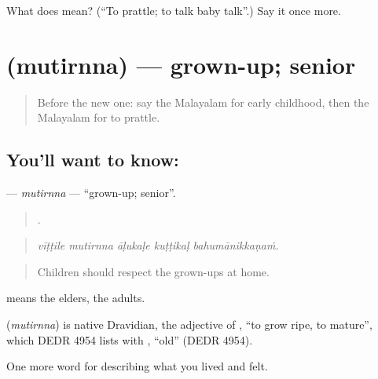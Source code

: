 \begin{tcolorbox}[breakable,colback=teal!4,colframe=teal!35!black,title={Before you move on}]
What does  mean? (\textquotedblleft{}To prattle; to talk baby talk\textquotedblright{}.) Say it once more.
\end{tcolorbox}
\section[\texorpdfstring{\ml{മുതിർന്ന} (mutirnna)}{മുതിർന്ന (mutirnna)}]{ (mutirnna) — grown-up; senior}

\label{lesson:ML-C558-mutirnna}



\begin{quote}
Before the new one: say the Malayalam for early childhood, then the Malayalam for to prattle.
\end{quote}

\subsection*{You'll want to know: }
\textbf{} — \emph{mutirnna} — \textquotedblleft{}grown-up; senior\textquotedblright{}.

\begin{quote}
    .
\end{quote}

\begin{quote}
\emph{vīṭṭile mutirnna āḷukaḷe kuṭṭikaḷ bahumānikkaṇaṁ.}
\end{quote}

\begin{quote}
Children should respect the grown-ups at home.
\end{quote}

 means the elders, the adults.

\begin{cousinweb}
\textbf{} (\emph{mutirnna}) is native Dravidian, the adjective of , \textquotedblleft{}to grow ripe, to mature\textquotedblright{}, which DEDR 4954 lists with , \textquotedblleft{}old\textquotedblright{} (DEDR 4954).
\end{cousinweb}

\begin{grammarlens}[title={What you've built}]
One more word for describing what you lived and felt.
\end{grammarlens}

